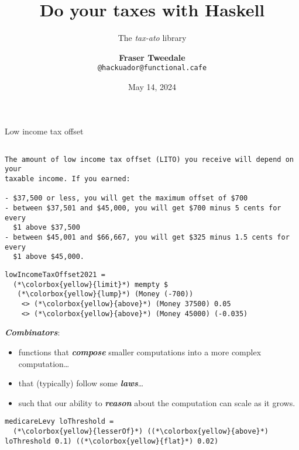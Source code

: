 \documentclass[ignorenonframetext,aspectratio=169,12pt]{beamer}
\title{\bf Do your taxes with Haskell}
\subtitle{\footnotesize The {\em tax-ato} library}
\author{{\bf Fraser Tweedale}\\
    \texttt{@hackuador@functional.cafe}}
\date{May 14, 2024}
\begin{document}
\frame{\titlepage}

\begin{frame}[fragile]{Low income tax offset}
\footnotesize
\begin{verbatim}

The amount of low income tax offset (LITO) you receive will depend on your
taxable income. If you earned:

- $37,500 or less, you will get the maximum offset of $700
- between $37,501 and $45,000, you will get $700 minus 5 cents for every
  $1 above $37,500
- between $45,001 and $66,667, you will get $325 minus 1.5 cents for every
  $1 above $45,000.

\end{verbatim}

\end{frame}

\begin{frame}[fragile]
\center

\begin{lstlisting}
lowIncomeTaxOffset2021 =
  (*\colorbox{yellow}{limit}*) mempty $
   (*\colorbox{yellow}{lump}*) (Money (-700))
    <> (*\colorbox{yellow}{above}*) (Money 37500) 0.05
    <> (*\colorbox{yellow}{above}*) (Money 45000) (-0.035)
\end{lstlisting}

\end{frame}


\begin{frame}[plain]{}
\textbf{\em Combinators}:
\begin{itemize}
  \item functions that \textbf{\em compose} smaller computations into
    a more complex computation\ldots{}
  \item that (typically) follow some \textbf{\em laws}\ldots{}
  \item such that our ability to \textbf{\em reason} about the computation can
    scale as it grows.
\end{itemize}
\end{frame}

\begin{frame}[fragile]
\center

\begin{lstlisting}
medicareLevy loThreshold =
  (*\colorbox{yellow}{lesserOf}*) ((*\colorbox{yellow}{above}*) loThreshold 0.1) ((*\colorbox{yellow}{flat}*) 0.02)
\end{lstlisting}

\end{frame}
\end{document}
